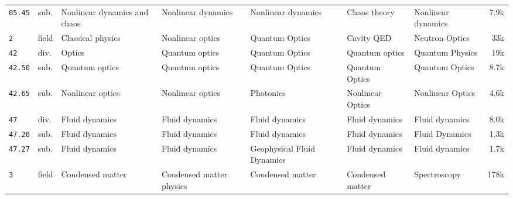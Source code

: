\documentclass[9pt]{article}
\begin{document}
\begin{tabularx}{\linewidth}{@{}l l Y Y Y Y Y r@{}}
\texttt{05.45} & sub. & Nonlinear dynamics and chaos & Nonlinear dynamics & Nonlinear dynamics & Chaos theory & Nonlinear dynamics & 7.9k \\
\texttt{2} & field & Classical physics & Nonlinear optics & Quantum Optics & Cavity QED & Neutron Optics & 33k \\
\texttt{42} & div. & Optics & Quantum optics & Quantum Optics & Quantum optics & Quantum Physics & 19k \\
\texttt{42.50} & sub. & Quantum optics & Quantum optics & Quantum Optics & Quantum Optics & Quantum Optics & 8.7k \\
\texttt{42.65} & sub. & Nonlinear optics & Nonlinear optics & Photonics & Nonlinear Optics & Nonlinear Optics & 4.6k \\
\texttt{47} & div. & Fluid dynamics & Fluid dynamics & Fluid dynamics & Fluid dynamics & Fluid dynamics & 8.0k \\
\texttt{47.20} & sub. & Fluid dynamics & Fluid dynamics & Fluid dynamics & Fluid dynamics & Fluid Dynamics & 1.3k \\
\texttt{47.27} & sub. & Fluid dynamics & Fluid dynamics & Geophysical Fluid Dynamics & Fluid dynamics & Fluid dynamics & 1.7k \\
\texttt{3} & field & Condensed matter & Condensed matter physics & Condensed matter & Condensed matter & Spectroscopy & 178k \\

\end{tabularx}
\end{document}
